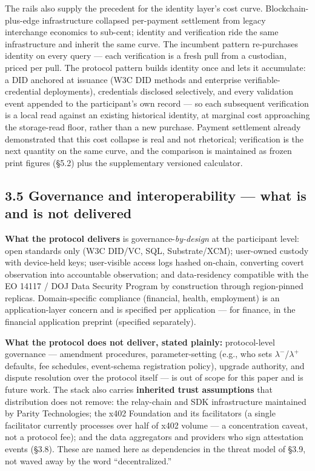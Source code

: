 \documentclass[11pt,twocolumn]{article}
\begin{document}
The rails also supply the precedent for the identity layer's cost curve.
Blockchain-plus-edge infrastructure collapsed per-payment settlement
from legacy interchange economics to sub-cent; identity and verification
ride the same infrastructure and inherit the same curve. The incumbent
pattern re-purchases identity on every query --- each verification is a
fresh pull from a custodian, priced per pull. The protocol pattern
builds identity once and lets it accumulate: a DID anchored at issuance
(W3C DID methods and enterprise verifiable-credential deployments), credentials disclosed selectively, and every validation event
appended to the participant's own record --- so each subsequent
verification is a local read against an existing historical identity, at
marginal cost approaching the storage-read floor, rather than a new
purchase. Payment settlement already demonstrated that this cost
collapse is real and not rhetorical; verification is the next quantity
on the same curve, and the comparison is maintained as frozen print
figures (§5.2) plus the supplementary versioned calculator.

\subsection*{3.5 Governance and interoperability --- what is and is not
delivered}

\textbf{What the protocol delivers} is
governance-\emph{by-design} at the participant level: open standards
only (W3C DID/VC, SQL, Substrate/XCM); user-owned custody with
device-held keys; user-visible access logs hashed on-chain, converting
covert observation into accountable observation; and data-residency
compatible with the EO 14117 / DOJ Data Security Program
\citep[in force since April 2025]{doj2025} by construction through
region-pinned replicas. Domain-specific compliance (financial, health,
employment) is an application-layer concern and is specified per
application --- for finance, in the financial application preprint (specified separately).

\textbf{What the protocol does not deliver, stated plainly:}
protocol-level governance --- amendment procedures, parameter-setting
(e.g., who sets \(\lambda^{-}\)/\(\lambda^{+}\) defaults, fee schedules,
event-schema registration policy), upgrade authority, and dispute
resolution over the protocol itself --- is out of scope for this paper
and is future work. The stack also carries \textbf{inherited trust
assumptions} that distribution does not remove: the relay-chain and SDK
infrastructure maintained by Parity Technologies; the x402 Foundation
and its facilitators (a single facilitator currently processes over half
of x402 volume --- a concentration caveat, not a protocol fee); and the
data aggregators and providers who sign attestation events (§3.8). These
are named here as dependencies in the threat model of §3.9, not waved
away by the word ``decentralized.''
\end{document}
